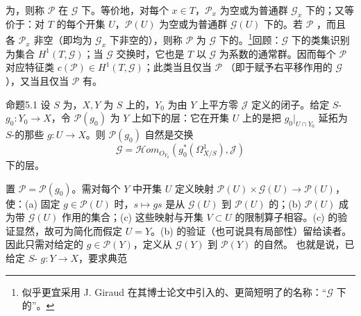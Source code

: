 为，则称 $\mathcal P$ 在 $\mathcal G$ 下。等价地，对每个 $x\in T$，$\mathcal P_x$ 为空或为普通群 $\mathcal G_x$ 下的；又等价于：对 $T$ 的每个开集 $U$，$\mathcal P(U)$ 为空或为普通群 $\mathcal G(U)$ 下的。若 $\mathcal P$ ，而且各 $\mathcal P_x$ 非空（即均为 $\mathcal G_x$ 下非空的），则称 $\mathcal P$ 为 $\mathcal G$ 下的。\footnote{似乎更宜采用 J. Giraud 在其博士论文中引入的、更简短明了的名称：“$\mathcal G$ 下的”。}回顾：$\mathcal G$ 下的类集识别为集合 $H^1(T,\mathcal G)$；当 $\mathcal G$ 交换时，它也是 $T$ 以 $\mathcal G$ 为系数的通常群。因而每个 $\mathcal P$ 对应特征类 $c(\mathcal P)\in H^1(T,\mathcal G)$；此类当且仅当 $\mathcal P$ （即于赋予右平移作用的 $\mathcal G$），又当且仅当 $\mathcal P$ 有。
\begin{SGAresult}{命题}{5.1}
设 $S$ 为，$X,Y$ 为 $S$ 上的，$Y_0$ 为由 $Y$ 上平方零 $\mathcal J$ 定义的闭子。给定 $S$- $g_0:Y_0\to X$，令 $\mathcal P(g_0)$ 为 $Y$ 上如下的层：它在开集 $U$ 上的是把 $g_0|_{U\cap Y_0}$ 延拓为 $S$-的那些 $g:U\to X$。则 $\mathcal P(g_0)$ 自然是交换
\[\mathcal G=\mathcal H\!om_{O_{Y_0}}(g_0^*(\Omega^1_{X/S}),\mathcal J)\]
下的层。
\end{SGAresult}
置 $\mathcal P=\mathcal P(g_0)$。需对每个 $Y$ 中开集 $U$ 定义映射 $\mathcal P(U)\times\mathcal G(U)\to\mathcal P(U)$，使：(a) 固定 $g\in\mathcal P(U)$ 时，$s\mapsto gs$ 是从 $\mathcal G(U)$ 到 $\mathcal P(U)$ 的；(b) $\mathcal P(U)$ 成为带 $\mathcal G(U)$ 作用的集合；(c) 这些映射与开集 $V\subset U$ 的限制算子相容。(c) 的验证显然，故可为简化而假定 $U=Y$。(b) 的验证（也可说具有局部性）留给读者。因此只需对给定的 $g\in\mathcal P(Y)$，定义从 $\mathcal G(Y)$ 到 $\mathcal P(Y)$ 的自然。
也就是说，已给定 $S$- $g:Y\to X$，要求典范
